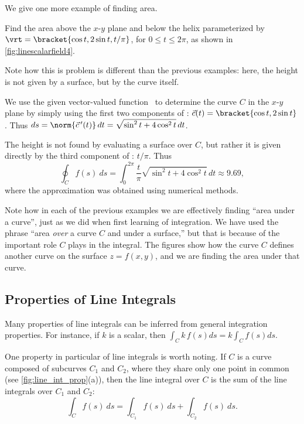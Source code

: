 We give one more example of finding area.


{Find the area above the $x$-$y$ plane and below the helix parameterized by $\vrt =\bracket{\cos t,2\sin t,t/\pi}$, for $0\leq t\leq 2\pi$, as shown in \autoref{fig:linescalarfield4}.}
{Note how this is problem is different than the previous examples: here, the height is not given by a surface, but by the curve itself. 

We use the given vector-valued function \vrt\ to determine the curve $C$ in the $x$-$y$ plane by simply using the first two components of \vrt: $\vec c(t) =\bracket{\cos t,2\sin t}$. Thus $ds = \norm{\vec c\,'(t)}\,dt = \sqrt{\sin^2t + 4\cos^2t}\,dt$. 

The height is not found by evaluating a surface over $C$, but rather it is given directly by the third component of \vrt: $t/\pi$. Thus
\[
\oint_C f(s)\ ds
= \int_0^{2\pi} \frac{t}{\pi}\sqrt{\sin^2t + 4\cos^2t}\,dt \approx 9.69,
\]
where the approximation was obtained using numerical methods.}

Note how in each of the previous examples we are effectively finding ``area under a curve'', just as we did when first learning of integration. We have used the phrase ``area \emph{over} a curve $C$ and under a surface,'' but that is because of the important role $C$ plays in the integral. The figures show how the curve $C$ defines another curve on the surface $z=f(x,y)$, and we are finding the area under that curve.

\subsection{Properties of Line Integrals}

Many properties of line integrals can be inferred from general integration properties. For instance, if $k$ is a scalar, then $\int_C k\,f(s)ds = k\int_Cf(s)ds$.

One property in particular of line integrals is worth noting. If $C$ is a curve composed of subcurves $C_1$ and $C_2$, where they share only one point in common (see \autoref{fig:line_int_prop}(a)), then the line integral over $C$ is the sum of the line integrals over $C_1$ and $C_2$: 
\[\int_Cf(s)\ ds = \int_{C_1}f(s)\ ds+\int_{C_2}f(s)\ ds.\]

